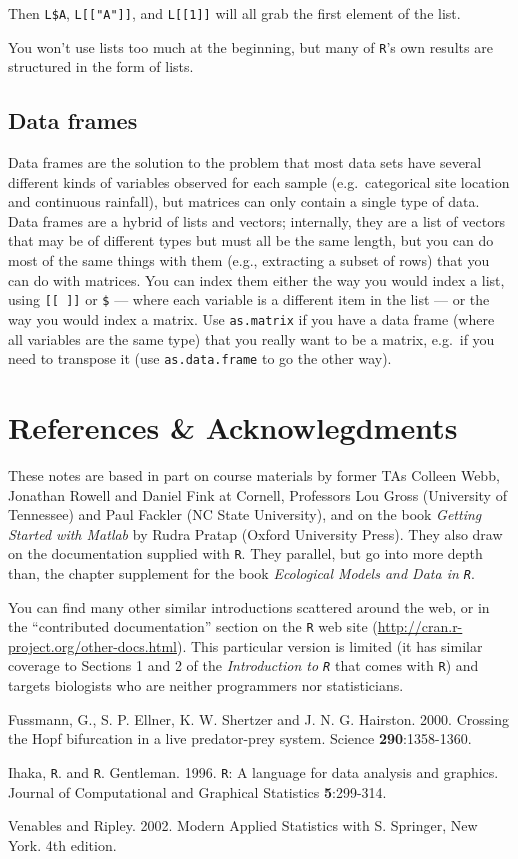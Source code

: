 \documentclass[11pt,]{article}
\begin{document}
Then \texttt{L\$A}, \texttt{L{[}{[}"A"{]}{]}}, and \texttt{L{[}{[}1{]}{]}} will all grab the first element of the list.

You won't use lists too much at the beginning, but many of \texttt{R}'s own results are structured in the form of lists.

\hypertarget{data-frames}{%
\subsection{Data frames}\label{data-frames}}

Data frames are the solution to the problem that most data sets have several different kinds of variables observed for each sample (e.g.~categorical site location and continuous rainfall), but matrices can only contain a single type of data. Data frames are a hybrid of lists and vectors; internally, they are a list of vectors that may be of different types but must all be the same length, but you can do most of the same things with them (e.g., extracting a subset of rows) that you can do with matrices. You can index them either the way you would index a list, using \texttt{{[}{[}\ {]}{]}} or \texttt{\$} --- where each variable is a different item in the list --- or the way you would index a matrix. Use \texttt{as.matrix} if you have a data frame (where all variables are the same type) that you really want to be a matrix, e.g.~if you need to transpose it (use \texttt{as.data.frame} to go the other way).

\hypertarget{references-acknowlegdments}{%
\section{References \& Acknowlegdments}\label{references-acknowlegdments}}

These notes are based in part on course materials by former TAs Colleen Webb, Jonathan Rowell and Daniel Fink at Cornell, Professors Lou Gross (University of Tennessee) and Paul Fackler (NC State University), and on the book \emph{Getting Started with Matlab} by Rudra Pratap (Oxford University Press). They also draw on the documentation supplied with \texttt{R}. They parallel, but go into more depth than, the chapter supplement for the book \emph{Ecological Models and Data in \texttt{R}}.

You can find many other similar introductions scattered around the web, or in the ``contributed documentation'' section on the \texttt{R} web site (\url{http://cran.r-project.org/other-docs.html}). This particular version is limited (it has similar coverage to Sections 1 and 2 of the \emph{Introduction to \texttt{R}} that comes with \texttt{R}) and targets biologists who are neither programmers nor statisticians.

Fussmann, G., S. P. Ellner, K. W. Shertzer and J. N. G. Hairston. 2000. Crossing the Hopf bifurcation in a live predator-prey system. Science \textbf{290}:1358-1360.

Ihaka, \texttt{R}. and \texttt{R}. Gentleman. 1996. \texttt{R}: A language for data analysis and graphics. Journal of Computational and Graphical Statistics \textbf{5}:299-314.

Venables and Ripley. 2002. Modern Applied Statistics with S. Springer, New York. 4th edition.
\end{document}
